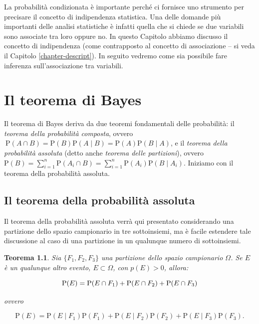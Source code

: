 \documentclass[
  11pt,
]{krantz}
\newtheorem{theorem}{Teorema}[chapter]
\theoremstyle{definition}
\theoremstyle{definition}
\theoremstyle{definition}
\theoremstyle{definition}
\theoremstyle{remark}
\begin{document}
La probabilità condizionata è importante perché ci fornisce uno strumento per precisare il concetto di indipendenza statistica. Una delle domande più importanti delle analisi statistiche è infatti quella che si chiede se due variabili sono associate tra loro oppure no. In questo Capitolo abbiamo discusso il concetto di indipendenza (come contrapposto al concetto di associazione -- si veda il Capitolo \ref{chapter-descript}). In seguito vedremo come sia possibile fare inferenza sull'associazione tra variabili.

\hypertarget{chapter-teo-bayes}{%
\chapter{Il teorema di Bayes}\label{chapter-teo-bayes}}

Il teorema di Bayes deriva da due teoremi fondamentali delle probabilità: il \emph{teorema della probabilità composta}, ovvero \(\ {\mbox{P}}(A\cap B)={\mbox{P}}(B){\mbox{P}}(A \mid B)={\mbox{P}}(A){\mbox{P}}(B \mid A)\), e il \emph{teorema della probabilità assoluta} (detto anche \emph{teorema delle partizioni}), ovvero \({\mbox{P}}(B)=\sum _{{i=1}}^{n}{\mbox{P}}(A_{i}\cap B)=\sum _{{i=1}}^{n}{\mbox{P}}(A_{i}){\mbox{P}}(B \mid A_{i})\). Iniziamo con il teorema della probabilità assoluta.

\hypertarget{il-teorema-della-probabilituxe0-assoluta}{%
\section{Il teorema della probabilità assoluta}\label{il-teorema-della-probabilituxe0-assoluta}}

Il teorema della probabilità assoluta verrà qui presentato considerando una partizione dello spazio campionario in tre sottoinsiemi, ma è facile estendere tale discussione al caso di una partizione in un qualunque numero di sottoinsiemi.

\begin{theorem}
Sia \(\{F_1, F_2, F_3\}\) una partizione dello spazio campionario \(\Omega\). Se \(E\) è un qualunque altro evento, \(E \subset \Omega\), con \(p(E) > 0\), allora:

\begin{equation}
{\mbox{P}}(E) = {\mbox{P}}(E \cap F_1) + {\mbox{P}}(E \cap F_2) + {\mbox{P}}(E \cap F_3) \notag
\label{eq:prob-total-1a}
\end{equation}

ovvero

\begin{equation}
{\mbox{P}}(E) = {\mbox{P}}(E \mid F_1) {\mbox{P}}(F_1) + {\mbox{P}}(E \mid F_2) {\mbox{P}}(F_2) + {\mbox{P}}(E \mid F_3) {\mbox{P}}(F_3).
\label{eq:prob-total-1b}
\end{equation}
\end{theorem}
\end{document}
